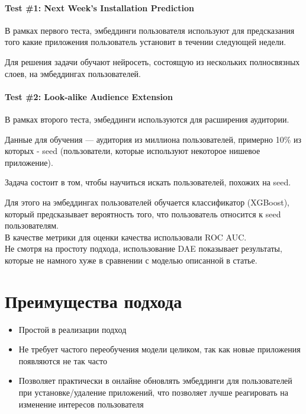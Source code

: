 \paragraph{Test \#1: Next Week’s Installation Prediction} В рамках первого теста, эмбеддинги пользователя используют для предсказания того какие приложения пользователь установит в течении следующей недели.

Для решения задачи обучают нейросеть, состоящую из нескольких полносвязных слоев, на эмбеддингах пользователей.

\paragraph{Test \#2: Look-alike Audience Extension} В рамках второго теста, эмбеддинги используются для расширения аудитории.

Данные для обучения --- аудитория из миллиона пользователей, примерно 10\% из которых - seed (пользователи, которые используют некоторое нишевое приложение). 

Задача состоит в том, чтобы научиться искать пользователей, похожих на seed. 

Для этого на эмбеддингах пользователей обучается классификатор (XGBoost), который предсказывает вероятность того, что пользователь относится к seed пользователям. \\

В качестве метрики для оценки качества использовали ROC AUC. \\

Не смотря на простоту подхода, использование DAE показывает результаты, которые не намного хуже в сравнении с моделью описанной в статье.

\section{Преимущества подхода}

\begin{itemize}
    \item Простой в реализации подход
    \item Не требует частого переобучения модели целиком, так как новые приложения появляются не так часто
    \item Позволяет практически в онлайне обновлять эмбеддинги для пользователей при установке/удаление приложений, что позволяет лучше реагировать на изменение интересов пользователя
\end{itemize}
